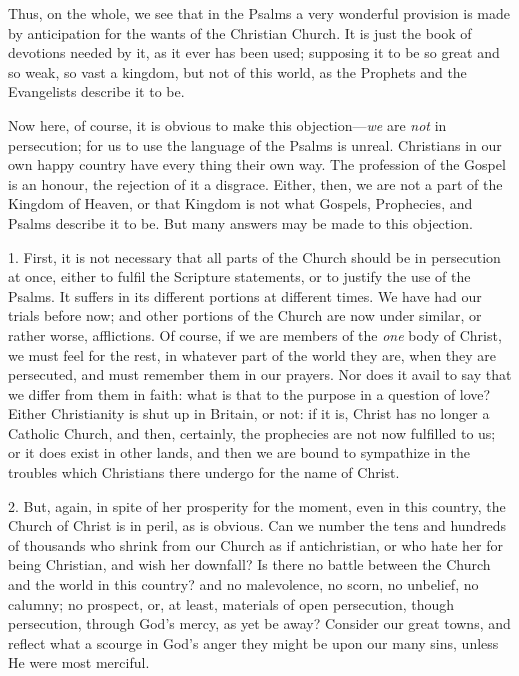 Thus, on the whole, we see that in the Psalms a very wonderful
provision is made by anticipation for the wants of the Christian
Church. It is just the book of devotions needed by it, as it ever has
been used; supposing it to be so great and so weak, so vast a kingdom,
but not of this world, as the Prophets and the Evangelists describe it
to be.

Now here, of course, it is obvious to make this objection—\emph{we}
are \emph{not} in persecution; for us to use the language of the
Psalms is unreal. Christians in our own happy country have every thing
their own way. The profession of the Gospel is an honour, the
rejection of it a disgrace. Either, then, we are not a part of the
Kingdom of Heaven, or that Kingdom is not what Gospels, Prophecies,
and Psalms describe it to be. But many answers may be made to this
objection.

1. First, it is not necessary that all parts of the Church should
be in persecution at once, either to fulfil the Scripture statements,
or to justify the use of the Psalms. It suffers in its different
portions at different times. We have had our trials before now; and
other portions of the Church are now under similar, or rather worse,
afflictions. Of course, if we are members of the \emph{one} body of
Christ, we must feel for the rest, in whatever part of the world they
are, when they are persecuted, and must remember them in our prayers.
Nor does it avail to say that we differ from them in faith: what is
that to the purpose in a question of love? Either Christianity is shut
up in Britain, or not: if it is, Christ has no longer a Catholic
Church, and then, certainly, the prophecies are not now fulfilled to
us; or it does exist in other lands, and then we are bound to
sympathize in the troubles which Christians there undergo for the name
of Christ.

2. But, again, in spite of her prosperity for the moment, even in
this country, the Church of Christ is in peril, as is obvious. Can we
number the tens and hundreds of thousands who shrink from our Church
as if antichristian, or who hate her for being Christian, and wish her
downfall? Is there no battle between the Church and the world in this
country? and no malevolence, no scorn, no unbelief, no calumny; no
prospect, or, at least, materials of open persecution, though
persecution, through God's mercy, as yet be away? Consider our great
towns, and reflect what a scourge in God's anger they might be upon
our many sins, unless He were most merciful.

